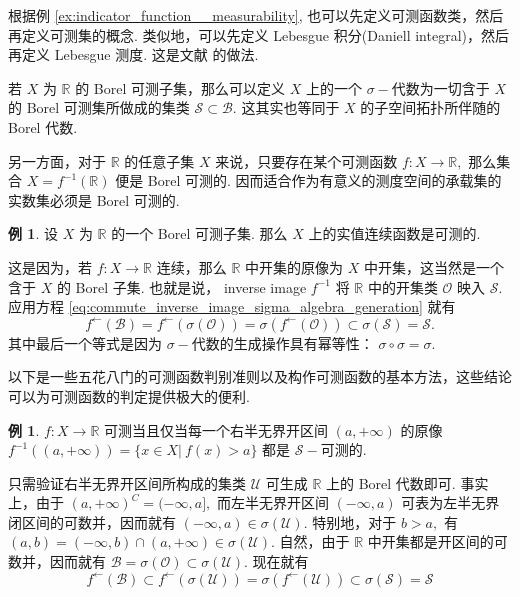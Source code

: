 \documentclass[12pt, a4paper, oneside]{book}
\numberwithin{figure}{section}
\theoremstyle{definition}
\newtheorem{example}[theorem]{例}
\begin{document}
根据例 \ref{ex:indicator_function__measurability}, 也可以先定义可测函数类，然后再定义可测集的概念. 类似地，可以先定义 Lebesgue 积分(Daniell integral)，然后再定义 Lebesgue 测度. 这是文献 \cite{Willem_2022} 的做法.

若 $X$ 为 $\mathbb R$ 的 Borel 可测子集，那么可以定义 $X$ 上的一个 $\sigma-$代数为一切含于 $X$ 的 Borel 可测集所做成的集类 $\mathcal S\subset \mathcal B.$ 这其实也等同于 $X$ 的子空间拓扑所伴随的 Borel 代数.

另一方面，对于 $\mathbb R$ 的任意子集 $X$ 来说，只要存在某个可测函数 $f:X\to\mathbb R,$ 那么集合 $X=f^{-1}(\mathbb R)$ 便是 Borel 可测的. 因而适合作为有意义的测度空间的承载集的实数集必须是 Borel 可测的.
\begin{example}
    设 $X$ 为 $\mathbb R$ 的一个 Borel 可测子集. 那么 $X$ 上的实值连续函数是可测的.
\end{example}
这是因为，若 $f:X\to\mathbb R$ 连续，那么 $\mathbb R$ 中开集的原像为 $X$ 中开集，这当然是一个含于 $X$ 的 Borel 子集.
也就是说， inverse image $f^{-1}$ 将 $\mathbb R$ 中的开集类 $\mathcal O$ 映入 $\mathcal S.$ 应用方程 \eqref{eq:commute_inverse_image_sigma_algebra_generation} 就有
\begin{equation}
    f^\leftarrow(\mathcal B)=f^\leftarrow(\sigma(\mathcal O))=\sigma(f^\leftarrow(\mathcal O))\subset \sigma(\mathcal S)=\mathcal S.
\end{equation}
其中最后一个等式是因为 $\sigma-$代数的生成操作具有幂等性： $\sigma\circ\sigma=\sigma.$

以下是一些五花八门的可测函数判别准则以及构作可测函数的基本方法，这些结论可以为可测函数的判定提供极大的便利.

\begin{example}\label{ex:function__measurability_semiinfinite_open_interval}
    $f:X\to\mathbb R$ 可测当且仅当每一个右半无界开区间 $(a,+\infty)$ 的原像 $f^{-1}((a,+\infty))=\{x\in X|\ f(x)>a\}$ 都是 $\mathcal S-$可测的. 
\end{example}
只需验证右半无界开区间所构成的集类 $\mathcal U$ 可生成 $\mathbb R$ 上的 Borel 代数即可. 事实上，由于 $(a,+\infty)^C=(-\infty,a],$ 而左半无界开区间 $(-\infty,a)$ 可表为左半无界闭区间的可数并，因而就有 $(-\infty,a)\in\sigma(\mathcal U).$ 特别地，对于 $b>a,$ 有 $(a,b)=(-\infty,b)\cap (a,+\infty)\in\sigma(\mathcal U).$ 自然，由于 $\mathbb R$ 中开集都是开区间的可数并，因而就有 
$\mathcal B=\sigma(\mathcal O)\subset\sigma(\mathcal U).$ 现在就有
\begin{equation}
    f^{\leftarrow}(\mathcal B)\subset f^{\leftarrow}(\sigma(\mathcal U))=\sigma(f^{\leftarrow}(\mathcal U))\subset\sigma(\mathcal S)=\mathcal S
\end{equation}
\end{document}
